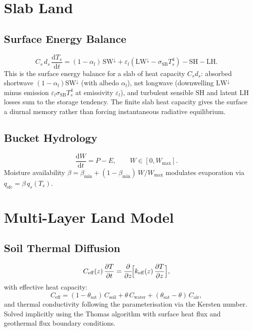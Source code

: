 \documentclass[11pt,twoside]{report}
\newcommand{\dd}{\mathrm{d}}
\newcommand{\pp}{\partial}
\newcommand{\SB}{\sigma_{\mathrm{SB}}}
\begin{document}
\section{Slab Land}

\subsection{Surface Energy Balance}
\begin{equation}
  C_s\,d_s\,\frac{\dd T_s}{\dd t}
  = (1-\alpha_l)\,\mathrm{SW}^\downarrow
  + \varepsilon_l(\mathrm{LW}^\downarrow-\SB T_s^4)
  - \mathrm{SH} - \mathrm{LH}.
\end{equation}
This is the surface energy balance for a slab of heat capacity $C_s d_s$:
absorbed shortwave $(1-\alpha_l)\mathrm{SW}^\downarrow$ (with albedo $\alpha_l$),
net longwave (downwelling $\mathrm{LW}^\downarrow$ minus emission
$\varepsilon_l\SB T_s^4$ at emissivity $\varepsilon_l$), and turbulent sensible
$\mathrm{SH}$ and latent $\mathrm{LH}$ losses sum to the storage tendency.  The
finite slab heat capacity gives the surface a diurnal memory rather than forcing
instantaneous radiative equilibrium.

\subsection{Bucket Hydrology}
\begin{equation}
  \frac{\dd W}{\dd t} = P - E, \qquad W\in[0,W_{\max}].
\end{equation}
Moisture availability
$\beta=\beta_{\min}+(1-\beta_{\min})\,W/W_{\max}$ modulates evaporation
via $q_{\mathrm{sfc}}=\beta\,q_s(T_s)$.


\section{Multi-Layer Land Model}

\subsection{Soil Thermal Diffusion}
\begin{equation}
  C_{\mathrm{eff}}(z)\,\frac{\pp T}{\pp t}
  = \frac{\pp}{\pp z}\!\Bigl[k_{\mathrm{eff}}(z)\,\frac{\pp T}{\pp z}\Bigr],
\end{equation}
with effective heat capacity:
\begin{equation}
  C_{\mathrm{eff}} = (1-\theta_{\mathrm{sat}})\,C_{\mathrm{soil}}
  + \theta\,C_{\mathrm{water}}
  + (\theta_{\mathrm{sat}}-\theta)\,C_{\mathrm{air}},
\end{equation}
and thermal conductivity following the \citet{Johansen1975} parameterisation
via the Kersten number.  Solved implicitly using the Thomas algorithm with
surface heat flux and geothermal flux boundary conditions.
\end{document}
